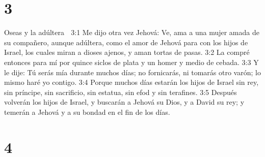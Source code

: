 \chapter{3}

Oseas y la adúltera  

3:1 Me dijo otra vez Jehová: Ve, ama a una mujer amada de su compañero, aunque adúltera, como el amor de Jehová para con los hijos de Israel, los cuales miran a dioses ajenos, y aman tortas de pasas.  
3:2 La compré entonces para mí por quince siclos de plata   y un homer y medio de cebada.  
3:3 Y le dije: Tú serás mía durante muchos días; no fornicarás, ni tomarás otro varón; lo mismo haré yo contigo. 
3:4 Porque muchos días estarán los hijos de Israel sin rey, sin príncipe, sin sacrificio, sin estatua, sin efod y sin terafines.  
3:5 Después volverán los hijos de Israel, y buscarán a Jehová su Dios, y a David su rey; y temerán a Jehová y a su bondad en el fin de los días.  

\chapter{4}

